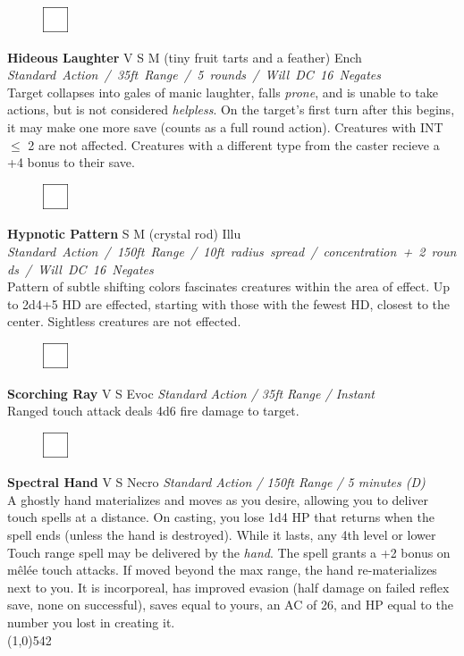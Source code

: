 \documentclass[letterpaper]{article}
\newcommand{\fullline}{\noindent\line(1,0){542} \\}
\newcommand{\spell}[7]{
\begin{figure}
\vspace{-13pt}
\ifstrequal{#2}{Full}{\includegraphics[width=2em]{Checkbox-Full}}{
                      \includegraphics[width=2em]{Checkbox}}
\ifstrequal{#7}{}{\vspace{-1em}}{\vspace{#7}}
\end{figure}
\noindent \textbf{#1} #3 {
    \ifstrequal{#4}{Conj}{\color{Plum}Conj}{%
    \ifstrequal{#4}{Divin}{\color{YellowOrange}Divin}{%
    \ifstrequal{#4}{Ench}{\color{VioletRed}Ench}{%
    \ifstrequal{#4}{Trans}{\color{LimeGreen}Trans}{%
    \ifstrequal{#4}{Evoc}{\color{RedOrange}Evoc}{%
    \ifstrequal{#4}{Illu}{\color{ProcessBlue}Illu}{%
    \ifstrequal{#4}{Abjur}{\color{CadetBlue}Abjur}{%
    \ifstrequal{#4}{Necro}{\color{Red}Necro}{%
}}}}}}}}}
{\footnotesize \emph{#5}} \\
#6
}
\begin{document}
\spell{Hideous Laughter}{}{V S M (tiny fruit tarts and a feather)}{Ench}{\mbox{Standard Action / 35ft Range / 5 rounds / Will DC 16 Negates }}{%
Target collapses into gales of manic laughter, falls \emph{prone}, and is unable to take actions, but is not considered \emph{helpless}. On the target's first turn after this begins, it may make one more save (counts as a full round action).  Creatures with INT $\leq$ 2 are not affected.  Creatures with a different type from the caster recieve a +4 bonus to their save.}{0em} %

\spell{Hypnotic Pattern}{}{S M (crystal rod)}{Illu}{\mbox{Standard Action / 150ft Range / 10ft radius spread / concentration + 2 rounds / Will DC 16 Negates }}{%
Pattern of subtle shifting colors fascinates creatures within the area of effect.  Up to 2d4+5 HD are effected, starting with those with the fewest HD, closest to the center.  Sightless creatures are not effected.}{} %

\spell{Scorching Ray}{}{V S}{Evoc}{Standard Action / 35ft Range / Instant}{%
Ranged touch attack deals 4d6 fire damage to target.}{}\\[-1em] %

\spell{Spectral Hand}{}{V S}{Necro}{\emph{Standard Action / 150ft Range / 5 minutes (D)}}{%
A ghostly hand materializes and moves as you desire, allowing you to deliver touch spells at a distance.  On casting, you lose 1d4 HP that returns when the spell ends (unless the hand is destroyed).  While it lasts, any 4th level or lower Touch range spell may be delivered by the \emph{hand}.  The spell grants a +2 bonus on m\^{e}l\'{e}e touch attacks. If moved beyond the max range, the hand re-materializes next to you.  It is incorporeal, has improved evasion (half damage on failed reflex save, none on successful), saves equal to yours, an AC of 26, and HP equal to the number you lost in creating it.}{2em}\\[-2em] %

\fullline
\vspace{-1.25em}

\end{document}

